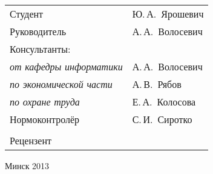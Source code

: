 \begin{titlepage}
\begin{center}
    \begin{tabular}{ p{}p{} }
      Студент & Ю.\,А.~Ярошевич \\
      Руководитель & А.\,А.~Волосевич \\
      Консультанты: &\\
      \hspace*{3ex}\emph{от кафедры информатики} & А.\,А.~Волосевич \\
      \hspace*{3ex}\emph{по экономической части} & А.\,В.~Рябов \\
      \hspace*{3ex}\emph{по охране труда} & Е.\,А.~Колосова \\
      Нормоконтролёр & С.\,И.~Сиротко\\
      & \\
      Рецензент &
    \end{tabular}
    
    \vfill
    {\normalsize Минск 2013}
  \end{center}
\end{titlepage}
